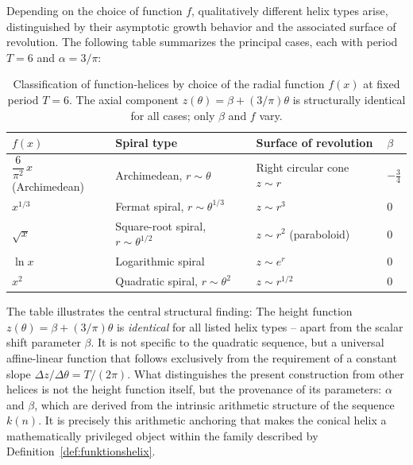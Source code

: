 Depending on the choice of function $f$, qualitatively different
helix types arise, distinguished by their asymptotic growth behavior and
the associated surface of revolution. The following table
summarizes the principal cases, each with period $T = 6$
and $\alpha = 3/\pi$:

\begin{table}[H]
\centering
\caption{Classification of function-helices by choice of the
radial function $f(x)$ at fixed period $T = 6$.
The axial component $z(\theta) = \beta + (3/\pi)\theta$ is
structurally identical for all cases; only $\beta$ and $f$ vary.}
\renewcommand{\arraystretch}{1.4}
\begin{tabular}{llll}
\toprule
$f(x)$ & Spiral type & Surface of revolution & $\beta$ \\
\midrule
$\dfrac{6}{\pi^2}\,x$\quad (Archimedean)
  & Archimedean, $r \sim \theta$
  & Right circular cone $z \sim r$
  & $-\tfrac{3}{4}$ \\[6pt]
$x^{1/3}$
  & Fermat spiral, $r \sim \theta^{1/3}$
  & $z \sim r^3$
  & $0$ \\[4pt]
$\sqrt{x}$
  & Square-root spiral, $r \sim \theta^{1/2}$
  & $z \sim r^2$ (paraboloid)
  & $0$ \\[4pt]
$\ln x$
  & Logarithmic spiral
  & $z \sim e^r$
  & $0$ \\[4pt]
$x^2$
  & Quadratic spiral, $r \sim \theta^2$
  & $z \sim r^{1/2}$
  & $0$ \\
\bottomrule
\end{tabular}
\end{table}

\begin{remark}
The table illustrates the central structural finding: The
height function $z(\theta) = \beta + (3/\pi)\theta$ is \emph{identical} for all
listed helix types -- apart from the scalar
shift parameter $\beta$. It is not specific to the
quadratic sequence, but a universal affine-linear function
that follows exclusively from the requirement of a constant slope
$\Delta z / \Delta\theta = T/(2\pi)$. What distinguishes the present
construction from other helices is not the
height function itself, but the provenance of its parameters: $\alpha$
and $\beta$, which are derived from the intrinsic arithmetic structure of the sequence $k(n)$. It is precisely this
arithmetic anchoring that makes the conical helix a mathematically
privileged object within the family described by
Definition~\ref{def:funktionshelix}.
\end{remark}

